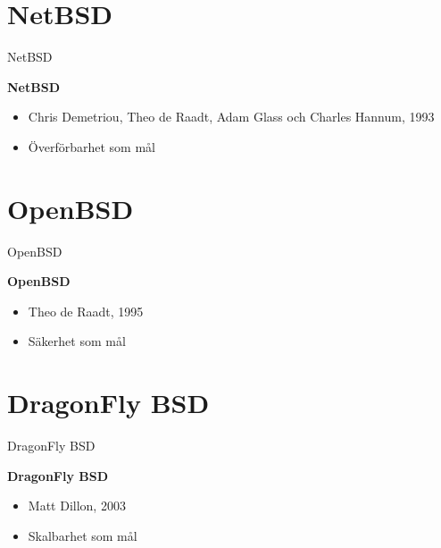 \documentclass[compress, final]{beamer}
\begin{document}
\section{NetBSD}

\begin{frame}{NetBSD}
  \begin{minipage}[l]{0.60\textwidth}
    \textbf{NetBSD}
    \begin{itemize}
      \item Chris Demetriou, Theo de Raadt, Adam Glass och Charles Hannum, 1993
      \item Överförbarhet som mål
    \end{itemize}
  \end{minipage}
  \begin{minipage}[r]{0.35\textwidth}
  \end{minipage}
\end{frame}


\section{OpenBSD}

\begin{frame}{OpenBSD}
  \begin{minipage}[l]{0.60\textwidth}
    \textbf{OpenBSD}
    \begin{itemize}
      \item Theo de Raadt, 1995
      \item Säkerhet som mål
    \end{itemize}
  \end{minipage}
  \begin{minipage}[r]{0.35\textwidth}
  \end{minipage}
\end{frame}


\section{DragonFly BSD}

\begin{frame}{DragonFly BSD}
  \begin{minipage}[l]{0.60\textwidth}
    \textbf{DragonFly BSD}
    \begin{itemize}
      \item Matt Dillon, 2003
      \item Skalbarhet som mål
    \end{itemize}
  \end{minipage}
  \begin{minipage}[r]{0.35\textwidth}
  \end{minipage}
\end{frame}
\end{document}
